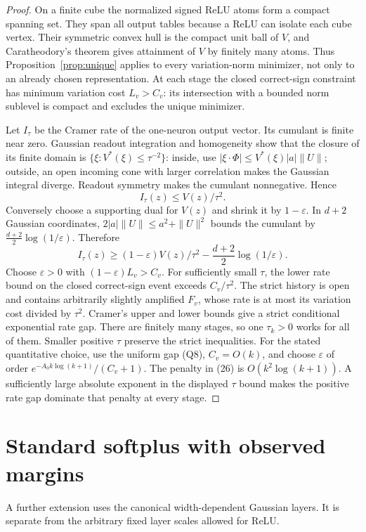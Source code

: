 \documentclass[11pt]{article}
\begin{document}
\begin{proof}
On a finite cube the normalized signed ReLU atoms form a compact
spanning set. They span all output tables because a ReLU can isolate
each cube vertex. Their symmetric convex hull is the compact unit ball
of $V$, and Caratheodory's theorem gives attainment of $V$ by finitely
many atoms. Thus Proposition~\ref{prop:unique} applies to every
variation-norm minimizer, not only to an already chosen representation.
At each stage the closed correct-sign constraint has minimum variation
cost $L_v>C_v$: its intersection with a bounded norm sublevel is compact
and excludes the unique minimizer.

Let $I_\tau$ be the Cramer rate of the one-neuron output vector.
Its cumulant is finite near zero. Gaussian readout integration and
homogeneity show that the closure of its finite domain is
$\{\xi:V^*(\xi)\le\tau^{-2}\}$: inside, use
$|\xi\cdot\Phi|\le V^*(\xi)|a|\|U\|$; outside, an open incoming cone
with larger correlation makes the Gaussian integral diverge.
Readout symmetry makes the cumulant nonnegative. Hence
\[
 I_\tau(z)\le V(z)/\tau^2.
\]
Conversely choose a supporting dual for $V(z)$ and shrink it by
$1-\varepsilon$. In $d+2$ Gaussian coordinates,
$2|a|\|U\|\le a^2+\|U\|^2$ bounds the cumulant by
$\frac{d+2}{2}\log(1/\varepsilon)$. Therefore
\[
 I_\tau(z)\ge (1-\varepsilon)V(z)/\tau^2
                         -\frac{d+2}{2}\log(1/\varepsilon). \tag{26}
\]
Choose $\varepsilon>0$ with $(1-\varepsilon)L_v>C_v$.
For sufficiently small $\tau$, the lower rate bound on the closed
correct-sign event exceeds $C_v/\tau^2$.
The strict history is open and contains arbitrarily slightly amplified
$F_v$, whose rate is at most its variation cost divided by $\tau^2$.
Cramer's upper and lower bounds give a strict conditional exponential
rate gap. There are finitely many stages, so one $\tau_k>0$ works for
all of them. Smaller positive $\tau$ preserve the strict inequalities.
For the stated quantitative choice, use the uniform gap (Q8),
$C_v=O(k)$, and choose
$\varepsilon$ of order $e^{-A_0k\log(k+1)}/(C_v+1)$.
The penalty in (26) is $O(k^2\log(k+1))$.
A sufficiently large absolute exponent in the displayed $\tau$ bound
makes the positive rate gap dominate that penalty at every stage.
\end{proof}

\section{Standard softplus with observed margins}
A further extension uses the canonical width-dependent Gaussian layers.
It is separate from the arbitrary fixed layer scales allowed for ReLU.
\end{document}

